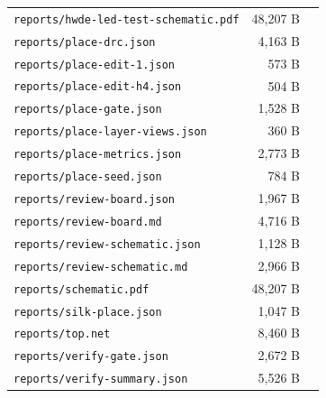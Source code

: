 \documentclass[11pt]{article}
\begin{document}
{\begin{longtable}{p{9cm}rp{4cm}}
\texttt{reports/hwde-led-test-schematic.pdf} & 48,207 B &  \\
\texttt{reports/place-drc.json} & 4,163 B &  \\
\texttt{reports/place-edit-1.json} & 573 B &  \\
\texttt{reports/place-edit-h4.json} & 504 B &  \\
\texttt{reports/place-gate.json} & 1,528 B &  \\
\texttt{reports/place-layer-views.json} & 360 B &  \\
\texttt{reports/place-metrics.json} & 2,773 B &  \\
\texttt{reports/place-seed.json} & 784 B &  \\
\texttt{reports/review-board.json} & 1,967 B &  \\
\texttt{reports/review-board.md} & 4,716 B &  \\
\texttt{reports/review-schematic.json} & 1,128 B &  \\
\texttt{reports/review-schematic.md} & 2,966 B &  \\
\texttt{reports/schematic.pdf} & 48,207 B &  \\
\texttt{reports/silk-place.json} & 1,047 B &  \\
\texttt{reports/top.net} & 8,460 B &  \\
\texttt{reports/verify-gate.json} & 2,672 B &  \\
\texttt{reports/verify-summary.json} & 5,526 B &  \\
\hline
\end{longtable}
}
\end{document}
